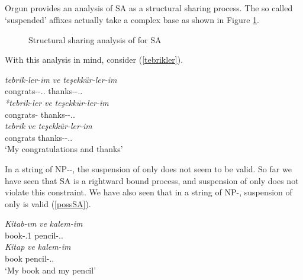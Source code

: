 \subsection{\cite{orgun1995flat}} \label{orgun}

Orgun provides an analysis of SA as a structural sharing process. The so called `suspended' affixes actually take a complex base as shown in Figure \ref{fig:orgun}.

\begin{figure}[hbt!]
    \centering
    \caption{Structural sharing analysis of \cite{orgun1995flat} for SA}
    \label{fig:orgun}
\end{figure}

With this analysis in mind, consider (\ref{tebrikler}). 
\begin{exe}
    \ex \label{tebrikler}
    \begin{xlist}
    \ex 
    \gll 
    \textit{tebrik-ler-im} \textit{ve} \textit{teşekkür-ler-im} \\ congrats-{\Pl}-{\Poss}.{\First}.{\Sg} {\And} thanks-{\Pl}-{\Poss}.{\First}.{\Sg} \\
    
    \ex \label{tebriklerug}
    \gll
    \textit{*tebrik-ler} \textit{ve} \textit{teşekkür-ler-im} \\ congrats-{\Pl} {\And} thanks-{\Pl}-{\Poss}.{\First}.{\Sg} \\
    
    \ex \label{tebriklerg}
    \gll 
    \textit{tebrik} \textit{ve} \textit{teşekkür-ler-im} \\ congrats {\And} thanks-{\Pl}-{\Poss}.{\First}.{\Sg} \\
    \glt `My congratulations and thanks'
    \end{xlist}
\end{exe}

In a string of NP-{\Pl}-{\Poss}, the suspension of only {\Poss} does not seem to be valid. So far we have seen that SA is a rightward bound process, and suspension of only {\Poss} does not violate this constraint. We have also seen that in a string of NP-{\Poss}, suspension of only {\Poss} is valid (\ref{possSA}).

\begin{exe}
    \ex \label{possSA}
    \begin{xlist}
        \ex 
        \gll 
        \textit{Kitab-ım} \textit{ve} \textit{kalem-im} \\ book-{\Poss}.1{\Sg} {\And} pencil-{\Poss}.{\First}.{\Sg} \\
        
        \ex 
        \gll 
        \textit{Kitap} \textit{ve} \textit{kalem-im} \\ book {\And} pencil-{\Poss}.{\First}.{\Sg} \\
        \glt `My book and my pencil'
    \end{xlist}
\end{exe}

